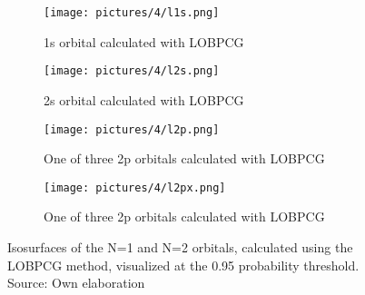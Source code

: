 \begin{figure}[h]
	\centering
	\begin{subfigure}[b]{0.45\textwidth}
		\centering
		\texttt{[image: pictures/4/l1s.png]}
		\caption{1s orbital calculated with LOBPCG}
		\label{fig:l1s}
	\end{subfigure}
	\hfill
	\begin{subfigure}[b]{0.45\textwidth}
		\centering
		\texttt{[image: pictures/4/l2s.png]}
		\caption{2s orbital calculated with LOBPCG}
		\label{fig:l2s}
	\end{subfigure}
	\hfill
	
	\bigskip
	
	\begin{subfigure}[b]{0.45\textwidth}
		\centering
		\texttt{[image: pictures/4/l2p.png]}
		\caption{One of three 2p orbitals calculated with LOBPCG}
		\label{fig:l2p}
	\end{subfigure}
	\hfill
	\begin{subfigure}[b]{0.45\textwidth}
		\centering
		\texttt{[image: pictures/4/l2px.png]}
		\caption{One of three 2p orbitals calculated with LOBPCG}
		\label{fig:l2px}
	\end{subfigure}
	\hfill
	\caption{Isosurfaces of the N=1 and N=2 orbitals, calculated using the LOBPCG method, visualized at the 0.95 probability threshold. Source: Own elaboration}
	\label{fig:1-2-orbitals}
\end{figure} 


